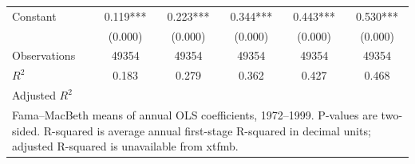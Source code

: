 {\begin{tabular}{l*{5}{c}}
Constant            &       0.119***&       0.223***&       0.344***&       0.443***&       0.530***\\
                    &     (0.000)   &     (0.000)   &     (0.000)   &     (0.000)   &     (0.000)   \\
\hline
Observations        &       49354   &       49354   &       49354   &       49354   &       49354   \\
\(R^{2}\)           &       0.183   &       0.279   &       0.362   &       0.427   &       0.468   \\
Adjusted \(R^{2}\)  &               &               &               &               &               \\
\hline\hline
\multicolumn{6}{l}{\footnotesize Fama–MacBeth means of annual OLS coefficients, 1972–1999. P-values are two-sided. R-squared is average annual first-stage R-squared in decimal units; adjusted R-squared is unavailable from xtfmb.}\\
\end{tabular}
}
